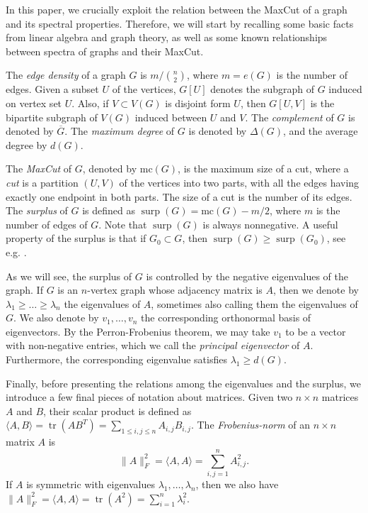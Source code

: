\documentclass[11pt]{article}
\theoremstyle{plain}
\theoremstyle{definition}
\DeclareMathOperator{\surp}{surp}
\DeclareMathOperator{\trace}{tr}
\begin{document}
In this paper, we crucially exploit the relation between the MaxCut of a graph and its spectral properties. Therefore, we will start by recalling  some basic facts from linear algebra and graph theory, as well as some known relationships between spectra of graphs and their MaxCut. 

The \emph{edge density} of a graph $G$ is $m/\binom{n}{2}$, where $m=e(G)$ is the number of edges. Given a subset $U$ of the vertices, $G[U]$ denotes the subgraph of $G$ induced on vertex set $U$. Also, if $V\subset V(G)$ is disjoint form $U$, then $G[U,V]$ is the bipartite subgraph of $V(G)$ induced between $U$ and $V$. The \emph{complement} of $G$ is denoted by $\overline{G}$. The \emph{maximum degree} of $G$ is denoted by $\Delta(G)$, and the average degree by $d(G)$.

The \emph{MaxCut} of $G$, denoted by $\mbox{mc}(G)$, is the maximum size of a cut, where a \emph{cut} is a partition $(U,V)$ of the vertices into two parts, with all the edges having exactly one endpoint in both parts. The size of a cut is the number of its edges. The \emph{surplus} of $G$ is defined as $\surp(G)=\mbox{mc}(G)-m/2$, where $m$ is the number of edges of $G$. Note that $\surp(G)$ is always nonnegative. A useful property of the surplus is that if $G_0\subset G$, then $\surp(G)\geq \surp(G_0)$, see e.g. \cite{GJS}.

As we will see, the surplus of $G$ is controlled by the negative eigenvalues of the graph. If $G$ is an $n$-vertex graph whose adjacency matrix is $A$, then we denote by $\lambda_1\geq\dots\geq \lambda_n$ the eigenvalues of $A$, sometimes also calling them the eigenvalues of $G$. We also denote by $v_1, \dots, v_n$ the corresponding orthonormal basis of eigenvectors. By the Perron-Frobenius theorem, we may take $v_1$ to be a vector with non-negative entries, which we call the \emph{principal eigenvector} of $A$. Furthermore, the corresponding eigenvalue satisfies $\lambda_1\geq d(G)$. 

Finally, before presenting the relations among the eigenvalues and the surplus, we introduce a few final pieces of notation about matrices. Given two $n\times n$ matrices $A$ and $B$, their scalar product is defined as $\langle A,B\rangle=\trace(AB^T)=\sum_{1\leq i,j\leq n} A_{i,j}B_{i,j}.$
The \emph{Frobenius-norm} of an $n\times n$ matrix $A$ is
$$\|A\|_F^2=\langle A,A\rangle=\sum_{i,j=1}^{n}A_{i,j}^2.$$
If $A$ is symmetric with  eigenvalues  $\lambda_1,\dots,\lambda_n$, then we also have $\|A\|_F^2= \langle A,A\rangle = \trace(A^2)=\sum_{i=1}^n\lambda_i^2$.
\end{document}
